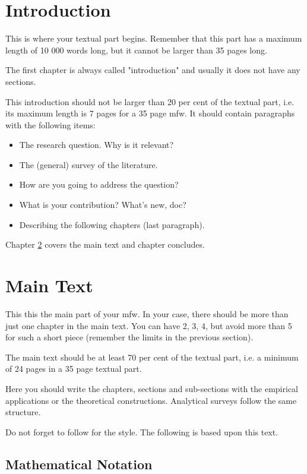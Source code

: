 \documentclass [12pt,a4paper,oneside]{article}
\begin{document}
\section{Introduction}\label{sec:introduction}

This is where your textual part begins. Remember that this part has a maximum length of 10 000 words long, but it cannot be larger than 35 pages long.

The first chapter is always called "introduction" and usually it does not have any sections.

This introduction should not be larger than 20 per cent of the textual part, i.e. its maximum length is 7 pages for a 35 page \gls{mfw}. It should contain paragraphs with the following items:
\begin{itemize}
\item The research question. Why is it relevant?
\item The (general) survey of the literature.
\item How are you going to address the question?
\item What is your contribution? What's new, doc?
\item Describing the following chapters (last paragraph).
\end{itemize}

Chapter \ref{sec:maintext} covers the main text and chapter \label{sec:conclusion} concludes.


\newpage %
\section{Main Text}\label{sec:maintext}

This this the main part of your \gls{mfw}. In your case, there should be more than just one chapter in the main text. You can have 2, 3, 4, but avoid more than 5 for such a short piece (remember the limits in the previous section).


The main text should be at least 70 per cent of the textual part, i.e. a minimum of 24 pages in a 35 page textual part.


Here you should write the chapters, sections and sub-sections with the empirical applications or the theoretical constructions. Analytical surveys follow the same structure.


Do not forget to follow \cite{costa_2017} for the style. The following is based upon this text.

	\subsection{Mathematical Notation}\label{subsec:mathematical}
\end{document}
